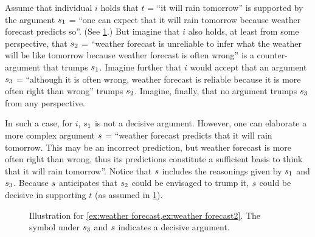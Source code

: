 \documentclass[smallextended,nospthms, natbib]{svjour3}
\begin{document}
\begin{example}
\label{ex:weather forecast}
Assume that individual $i$ holds that $t$ = “it will rain tomorrow” is supported by the argument $s_1$ = “one can expect that it will rain tomorrow because weather forecast predicts so”. (See \cref{fig:weather forecast}.) But imagine that $i$ also holds, at least from some perspective, that $s_2$ = “weather forecast is unreliable to infer what the weather will be like tomorrow because weather forecast is often wrong” is a counter-argument that trumps $s_1$. Imagine further that $i$ would accept that an argument $s_3$ = “although it is often wrong, weather forecast is reliable because it is more often right than wrong” trumps $s_2$. Imagine, finally, that no argument trumps $s_3$ from any perspective.

In such a case, for $i$, $s_1$ is not a decisive argument. However, one can elaborate a more complex argument $s$ = “weather forecast predicts that it will rain tomorrow. This may be an incorrect prediction, but weather forecast is more often right than wrong, thus its predictions constitute a sufficient basis to think that it will rain tomorrow”. Notice that $s$ includes the reasonings given by $s_1$ and $s_3$.
Because $s$ anticipates that $s_2$ could be envisaged to trump it, $s$ could be decisive in supporting $t$ (as assumed in \cref{fig:weather forecast}).
\end{example}
\begin{figure}
	\centering
	\caption{Illustration for \cref{ex:weather forecast,ex:weather forecast2}. The symbol under $s_3$ and $s$ indicates a decisive argument.}
	\label{fig:weather forecast}
\end{figure}
\end{document}
